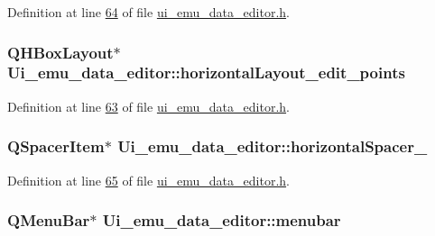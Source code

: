 Definition at line \hyperlink{a00138_source_l00064}{64} of file \hyperlink{a00138_source}{ui\+\_\+emu\+\_\+data\+\_\+editor.\+h}.

\hypertarget{a00079_ae08b661288ecee049945e4a63d0c0af0}{
\subsubsection[{horizontal\+Layout\+\_\+edit\+\_\+points}]{\setlength{\rightskip}{0pt plus 5cm}Q\+H\+Box\+Layout$\ast$ Ui\+\_\+emu\+\_\+data\+\_\+editor\+::horizontal\+Layout\+\_\+edit\+\_\+points}}\label{a00079_ae08b661288ecee049945e4a63d0c0af0}


Definition at line \hyperlink{a00138_source_l00063}{63} of file \hyperlink{a00138_source}{ui\+\_\+emu\+\_\+data\+\_\+editor.\+h}.

\hypertarget{a00079_a025c1b6f38c90cfa55572934535451a2}{
\subsubsection[{horizontal\+Spacer\+\_\+2}]{\setlength{\rightskip}{0pt plus 5cm}Q\+Spacer\+Item$\ast$ Ui\+\_\+emu\+\_\+data\+\_\+editor\+::horizontal\+Spacer\+\_}}\label{a00079_a025c1b6f38c90cfa55572934535451a2}


Definition at line \hyperlink{a00138_source_l00065}{65} of file \hyperlink{a00138_source}{ui\+\_\+emu\+\_\+data\+\_\+editor.\+h}.

\hypertarget{a00079_af09fe2fe1f34525f5caeb5ada7d297bf}{
\subsubsection[{menubar}]{\setlength{\rightskip}{0pt plus 5cm}Q\+Menu\+Bar$\ast$ Ui\+\_\+emu\+\_\+data\+\_\+editor\+::menubar}}\label{a00079_af09fe2fe1f34525f5caeb5ada7d297bf}


